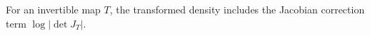 \begin{proposition}\label{prop:transport-logdet}
For an invertible map $T$, the transformed density includes the Jacobian correction term $\log |\det J_T|$.
\end{proposition}
